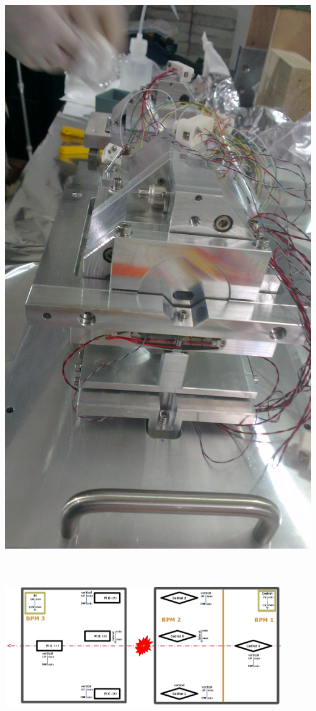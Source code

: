 \documentclass[a4paper,11pt]{book}
\begin{document}
\includegraphics[angle=0,scale=0.0355]{IMAG0460.jpg}\par
\includegraphics[angle=0,height=7.5cm,width=12cm]{interface.jpg}
\end{document}
